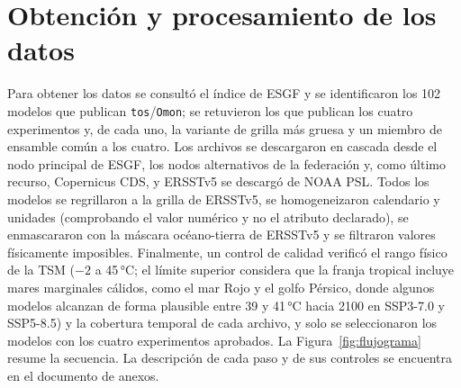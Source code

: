 \section{Obtención y procesamiento de los datos}
\label{sec:scripts}

Para obtener los datos se consultó el índice de ESGF y se identificaron los 102 modelos que publican \texttt{tos}/\texttt{Omon}; se retuvieron los que publican los cuatro experimentos y, de cada uno, la variante de grilla más gruesa y un miembro de ensamble común a los cuatro. Los archivos se descargaron en cascada desde el nodo principal de ESGF, los nodos alternativos de la federación y, como último recurso, Copernicus CDS, y ERSSTv5 se descargó de NOAA PSL. Todos los modelos se regrillaron a la grilla de ERSSTv5, se homogeneizaron calendario y unidades (comprobando el valor numérico y no el atributo declarado), se enmascararon con la máscara océano-tierra de ERSSTv5 y se filtraron valores físicamente imposibles. Finalmente, un control de calidad verificó el rango físico de la TSM ($-2$ a 45\,°C; el límite superior considera que la franja tropical incluye mares marginales cálidos, como el mar Rojo y el golfo Pérsico, donde algunos modelos alcanzan de forma plausible entre 39 y 41\,°C hacia 2100 en SSP3-7.0 y SSP5-8.5) y la cobertura temporal de cada archivo, y solo se seleccionaron los modelos con los cuatro experimentos aprobados. La Figura~\ref{fig:flujograma} resume la secuencia. La descripción de cada paso y de sus controles se encuentra en el documento de anexos.

